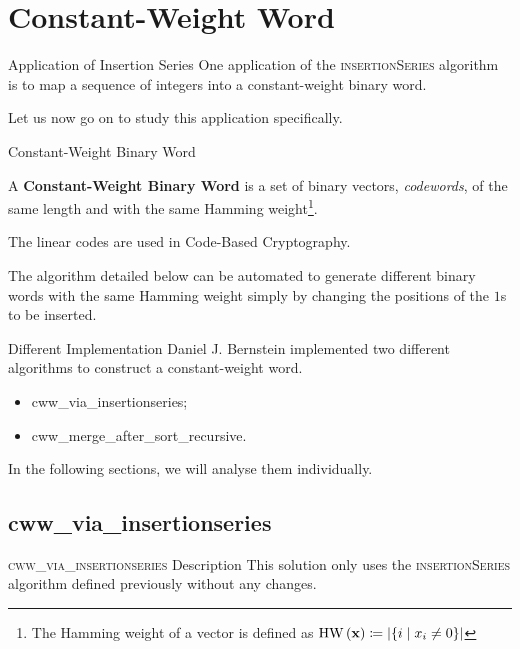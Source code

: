 \section{Constant-Weight Word}
    \begin{frame}{Application of Insertion Series}
        One application of the \textsc{insertionSeries} algorithm is to map a sequence of integers into a constant-weight binary word.

        \leavevmode        
        
        Let us now go on to study this application specifically.
    \end{frame}

    \begin{frame}{Constant-Weight Binary Word}
        \begin{definition}

            A \textbf{Constant-Weight Binary Word} is a set of binary vectors, \textit{codewords}, of the same length and with the same Hamming weight\footnote{The Hamming weight of a vector is defined as $\operatorname{HW}{\left(\mathbf{x}\right)} \coloneqq \left\lvert\left\{i \mid x_i \neq 0\right\}\right\rvert$}.
        \end{definition}

        The linear codes are used in Code-Based Cryptography.

        The algorithm detailed below can be automated to generate different binary words with the same Hamming weight simply by changing the positions of the $1$s to be inserted.
    \end{frame}

    \begin{frame}{Different Implementation}
        Daniel J. Bernstein implemented two different algorithms to construct a constant-weight word.
        \begin{itemize}
            \item cww\_via\_insertionseries;
            \item cww\_merge\_after\_sort\_recursive.
        \end{itemize}

        In the following sections, we will analyse them individually.
    \end{frame}

    \subsection{cww\_via\_insertionseries}
        \begin{frame}{\textsc{cww\_via\_insertionseries} Description}
            This solution only uses the \textsc{insertionSeries} algorithm defined previously without any changes.
        \end{frame}


